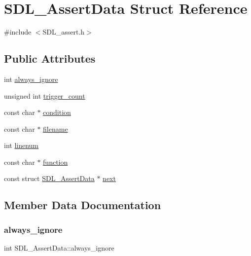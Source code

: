 \hypertarget{struct_s_d_l___assert_data}{}\section{S\+D\+L\+\_\+\+Assert\+Data Struct Reference}
\label{struct_s_d_l___assert_data}


{\ttfamily \#include $<$S\+D\+L\+\_\+assert.\+h$>$}

\subsection*{Public Attributes}
\begin{DoxyCompactItemize}
\item 
int \mbox{\hyperlink{struct_s_d_l___assert_data_a825e1c7772fe24afad33d0afc42cf04c}{always\+\_\+ignore}}
\item 
unsigned int \mbox{\hyperlink{struct_s_d_l___assert_data_a230bbcc2d115aab04cf817773e08eb5b}{trigger\+\_\+count}}
\item 
const char $\ast$ \mbox{\hyperlink{struct_s_d_l___assert_data_aec6d372462fa8c94a9d04c1168cd38c9}{condition}}
\item 
const char $\ast$ \mbox{\hyperlink{struct_s_d_l___assert_data_acf27f593e6a436386d2cbcf826cf1ef7}{filename}}
\item 
int \mbox{\hyperlink{struct_s_d_l___assert_data_ad026d8573970d2402230d5fa3c550b0f}{linenum}}
\item 
const char $\ast$ \mbox{\hyperlink{struct_s_d_l___assert_data_a4913c57d4affb813feea82fc5f48a25c}{function}}
\item 
const struct \mbox{\hyperlink{struct_s_d_l___assert_data}{S\+D\+L\+\_\+\+Assert\+Data}} $\ast$ \mbox{\hyperlink{struct_s_d_l___assert_data_a2081dcf06dce4df497e423bccddfc099}{next}}
\end{DoxyCompactItemize}


\subsection{Member Data Documentation}
\mbox{\label{struct_s_d_l___assert_data_a825e1c7772fe24afad33d0afc42cf04c}} 
\subsubsection{\texorpdfstring{always\+\_\+ignore}{always\_ignore}}
{\footnotesize\ttfamily int S\+D\+L\+\_\+\+Assert\+Data\+::always\+\_\+ignore}

